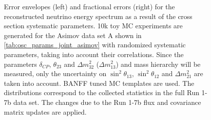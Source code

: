 \begin{figure}[htb]
\caption {
Error envelopes (left) and fractional errors (right) for the reconstructed neutrino energy spectrum
as a result of the cross section systematic parameters. 
10k toy MC experiments are generated for the Asimov data set A shown in \cref{tab:osc_params_joint_asimov}
with randomized systematic parameters, taking into account their correlations.
Since the parameters $\delta_{CP}$, $\theta_{23}$ and $\Delta m^2_{32}$ ($\Delta m^2_{13}$) and mass hierarchy
will be measured,
only the uncertainty on 
$\sin^2 \theta_{13}$,
$\sin^2 \theta_{12}$
and 
$\Delta m^2_{21}$ 
are taken into account.
BANFF tuned MC templates are used. 
The distributions correspond to the collected statistics in the full Run 1-7b data set.
The changes due to the Run 1-7b flux and covariance matrix updates are applied.
}
\label{fig:xsec_envelope_Asimov_A_run17b}
\end{figure}


